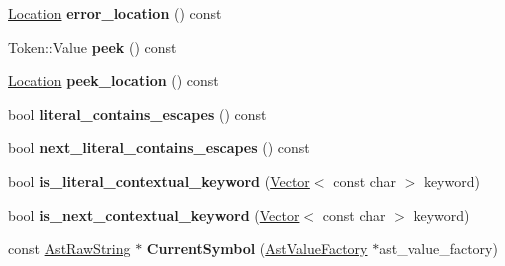 \begin{DoxyCompactItemize}
\item 
\hyperlink{structv8_1_1internal_1_1_scanner_1_1_location}{Location} {\bfseries error\+\_\+location} () const \hypertarget{classv8_1_1internal_1_1_scanner_acc923ed92efab882fff508bf7c207309}{}\label{classv8_1_1internal_1_1_scanner_acc923ed92efab882fff508bf7c207309}

\item 
Token\+::\+Value {\bfseries peek} () const \hypertarget{classv8_1_1internal_1_1_scanner_a7b0a83c26bbc31d44c49597d179463d8}{}\label{classv8_1_1internal_1_1_scanner_a7b0a83c26bbc31d44c49597d179463d8}

\item 
\hyperlink{structv8_1_1internal_1_1_scanner_1_1_location}{Location} {\bfseries peek\+\_\+location} () const \hypertarget{classv8_1_1internal_1_1_scanner_a1e8e7966c5945e7634e726516dd0c314}{}\label{classv8_1_1internal_1_1_scanner_a1e8e7966c5945e7634e726516dd0c314}

\item 
bool {\bfseries literal\+\_\+contains\+\_\+escapes} () const \hypertarget{classv8_1_1internal_1_1_scanner_aaf7da32ac05b58d24d1bc9d80d84ec0a}{}\label{classv8_1_1internal_1_1_scanner_aaf7da32ac05b58d24d1bc9d80d84ec0a}

\item 
bool {\bfseries next\+\_\+literal\+\_\+contains\+\_\+escapes} () const \hypertarget{classv8_1_1internal_1_1_scanner_ad30ca2616787158dfbd8bb83e34dfa44}{}\label{classv8_1_1internal_1_1_scanner_ad30ca2616787158dfbd8bb83e34dfa44}

\item 
bool {\bfseries is\+\_\+literal\+\_\+contextual\+\_\+keyword} (\hyperlink{classv8_1_1internal_1_1_vector}{Vector}$<$ const char $>$ keyword)\hypertarget{classv8_1_1internal_1_1_scanner_aeb40107bd95ec784e9ea6e2c3e229416}{}\label{classv8_1_1internal_1_1_scanner_aeb40107bd95ec784e9ea6e2c3e229416}

\item 
bool {\bfseries is\+\_\+next\+\_\+contextual\+\_\+keyword} (\hyperlink{classv8_1_1internal_1_1_vector}{Vector}$<$ const char $>$ keyword)\hypertarget{classv8_1_1internal_1_1_scanner_a3cf6896bdc143e71b4fa069e707c3a03}{}\label{classv8_1_1internal_1_1_scanner_a3cf6896bdc143e71b4fa069e707c3a03}

\item 
const \hyperlink{classv8_1_1internal_1_1_ast_raw_string}{Ast\+Raw\+String} $\ast$ {\bfseries Current\+Symbol} (\hyperlink{classv8_1_1internal_1_1_ast_value_factory}{Ast\+Value\+Factory} $\ast$ast\+\_\+value\+\_\+factory)\hypertarget{classv8_1_1internal_1_1_scanner_afe0444bbc19a257cf11e79c1dd6c2c60}{}\label{classv8_1_1internal_1_1_scanner_afe0444bbc19a257cf11e79c1dd6c2c60}


\end{DoxyCompactItemize}
